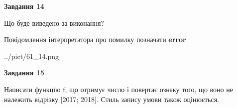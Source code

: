 \documentclass[11pt, ukrainian]{article}
\begin{document}
{\begin {large}
{\begin {center}\textbf{Завдання 14}\end {center}}\par
Що буде виведено за виконання? \par
Повідомлення інтерпретатора про помилку позначати \textbf{error}

\begin{center}
	{../pict/61_14.png}
\end{center}
\newpage

{\begin {center}\textbf{Завдання 15}\end {center}}\par

Написати функцiю f, що отримує число і повертає ознаку того, що воно не належить вiдрiзку [2017; 2018]. Стиль запису умови також оцінюється.\par
\newpage

\end {large}}
\end{document}
